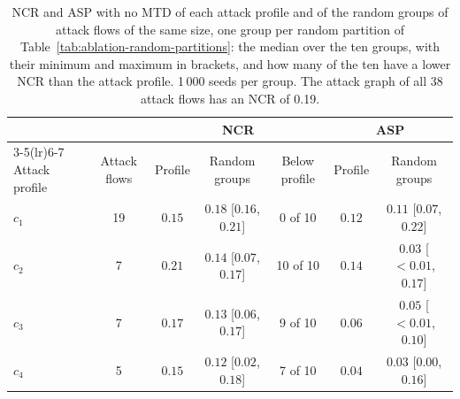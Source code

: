 
\begin{table}[htbp]
\centering
\caption[Each attack profile against random groups of the same size]{NCR and ASP with no MTD of each attack profile and of the random groups of attack flows of the same size, one group per random partition of Table~\ref{tab:ablation-random-partitions}: the median over the ten groups, with their minimum and maximum in brackets, and how many of the ten have a lower NCR than the attack profile. 1\,000 seeds per group. The attack graph of all 38 attack flows has an NCR of 0.19.}
\label{tab:fa-group-size}
\tablestyle
\begin{tabular}{@{}l c c c c c c@{}}
\toprule
& & \multicolumn{3}{c}{NCR} & \multicolumn{2}{c}{ASP} \\
\cmidrule(lr){3-5}\cmidrule(lr){6-7}
Attack profile & Attack flows & Profile & Random groups & Below profile & Profile & Random groups \\
\midrule
$c_1$ & 19 & $0.15$ & $0.18$ [$0.16$, $0.21$] & 0 of 10 & $0.12$ & $0.11$ [$0.07$, $0.22$] \\
$c_2$ & 7 & $0.21$ & $0.14$ [$0.07$, $0.17$] & 10 of 10 & $0.14$ & $0.03$ [${<}0.01$, $0.17$] \\
$c_3$ & 7 & $0.17$ & $0.13$ [$0.06$, $0.17$] & 9 of 10 & $0.06$ & $0.05$ [${<}0.01$, $0.10$] \\
$c_4$ & 5 & $0.15$ & $0.12$ [$0.02$, $0.18$] & 7 of 10 & $0.04$ & $0.03$ [$0.00$, $0.16$] \\
\bottomrule
\end{tabular}
\end{table}
